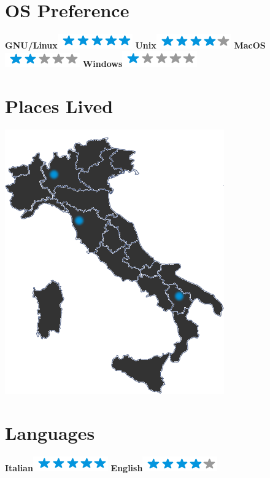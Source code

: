 \documentclass[]{friggeri-cv}
\begin{document}
\newpage

\begin{aside}
~
~
~
  \section{OS Preference}
    \textbf{GNU/Linux}\includegraphics[scale=0.40]{img/5stars.png}
    \textbf{Unix}\includegraphics[scale=0.40]{img/4stars.png}
    \textbf{MacOS}\includegraphics[scale=0.40]{img/2stars.png}
    \textbf{Windows}\includegraphics[scale=0.40]{img/1stars.png}
    ~
  \section{Places Lived}
    \includegraphics[scale=0.25]{img/italia.png}
    ~
  \section{Languages}
    \textbf{Italian}\includegraphics[scale=0.40]{img/5stars.png}
    \textbf{English}\includegraphics[scale=0.40]{img/4stars.png}
    ~
\end{aside}
\end{document}
